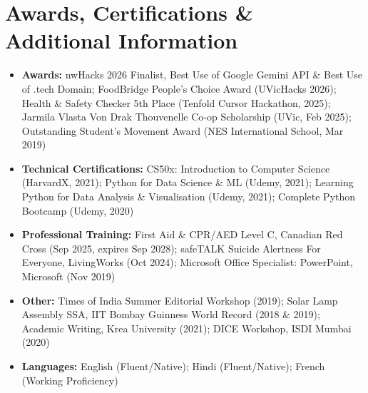 \documentclass[10pt,letterpaper]{article}
\newcommand{\infoLine}[2]{
  \item[] {\small \textbf{\textcolor{accentblue}{#1:}} #2}
}
\begin{document}
\section{Awards, Certifications \& Additional Information}
\begin{itemize}[leftmargin=0in, label={}]
  \infoLine{Awards}{nwHacks 2026 Finalist, Best Use of Google Gemini API \& Best Use of .tech Domain; FoodBridge People's Choice Award (UVicHacks 2026); Health \& Safety Checker 5th Place (Tenfold Cursor Hackathon, 2025); Jarmila Vlasta Von Drak Thouvenelle Co-op Scholarship (UVic, Feb 2025); Outstanding Student's Movement Award (NES International School, Mar 2019)}
  \vspace{2pt}
  \infoLine{Technical Certifications}{CS50x: Introduction to Computer Science (HarvardX, 2021); Python for Data Science \& ML (Udemy, 2021); Learning Python for Data Analysis \& Visualisation (Udemy, 2021); Complete Python Bootcamp (Udemy, 2020)}
  \vspace{2pt}
  \infoLine{Professional Training}{First Aid \& CPR/AED Level C, Canadian Red Cross (Sep 2025, expires Sep 2028); safeTALK Suicide Alertness For Everyone, LivingWorks (Oct 2024); Microsoft Office Specialist: PowerPoint, Microsoft (Nov 2019)}
  \vspace{2pt}
  \infoLine{Other}{Times of India Summer Editorial Workshop (2019); Solar Lamp Assembly SSA, IIT Bombay Guinness World Record (2018 \& 2019); Academic Writing, Krea University (2021); DICE Workshop, ISDI Mumbai (2020)}
  \vspace{2pt}
  \infoLine{Languages}{English (Fluent/Native); Hindi (Fluent/Native); French (Working Proficiency)}
\end{itemize}
\end{document}
